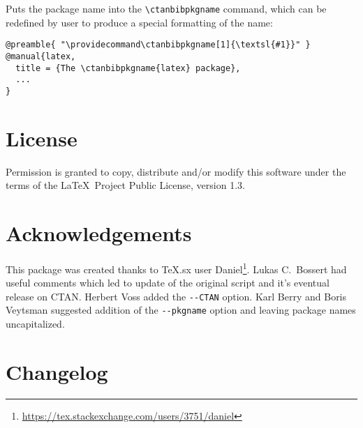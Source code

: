 \documentclass{ltxdoc}
\begin{document}
\noindent Puts the package name into the \verb|\ctanbibpkgname| command, which can be
redefined by user to produce a special formatting of the name:

\begin{verbatim}
@preamble{ "\providecommand\ctanbibpkgname[1]{\textsl{#1}}" }
@manual{latex,
  title = {The \ctanbibpkgname{latex} package},
  ...
}
\end{verbatim}


\section{License}

Permission is granted to copy, distribute and/or modify this software
under the terms of the \LaTeX\ Project Public License, version 1.3.

\section{Acknowledgements}

This package was created thanks to TeX.sx user
Daniel\footnote{\url{https://tex.stackexchange.com/users/3751/daniel}}. Lukas
C.~Bossert had useful comments which led to update of the original script and
it's eventual release on CTAN. Herbert Voss added the \verb|--CTAN| option.
Karl Berry and Boris Veytsman suggested addition of the \verb|--pkgname| option 
and leaving package names uncapitalized.

\newpage
\section{Changelog}
\end{document}
